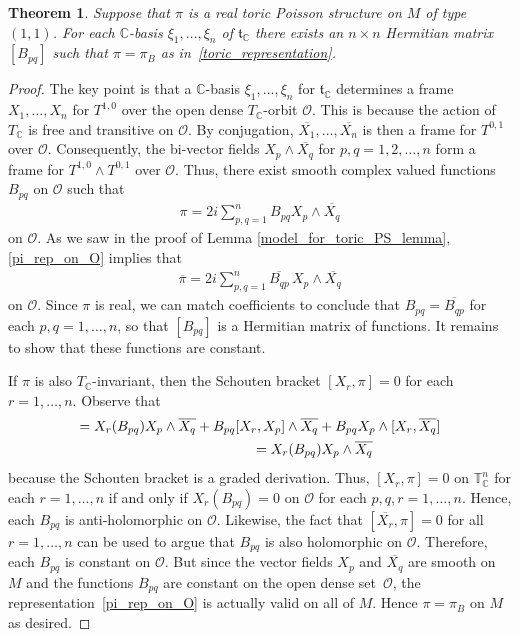 \documentclass[10pt,a4paper]{amsart}
\numberwithin{equation}{section}
\newtheorem{Theorem}{Theorem}[section]
\begin{document}
\begin{Theorem}\label{invariant_nondegenerate_PS_on_tori}
Suppose that $\pi$ is a real toric Poisson structure on $M$ of type $(1,1)$. For each ${\mathbb C}$-basis $\xi_1,\dots,\xi_n$ of ${\mathfrak t}_{\mathbb C}$ there exists an $n\times n$ Hermitian matrix $[B_{pq}]$ such that $\pi=\pi_B$ as in~\eqref{toric_representation}.
\end{Theorem}
\begin{proof}
The key point is that a ${\mathbb C}$-basis $\xi_1,\dots,\xi_n$ for ${\mathfrak t}_{\mathbb C}$ determines a frame $X_1,\dots,X_n$ for $T^{1,0}$ over the open dense $T_{\mathbb C}$-orbit $\mathcal O$. This is because the action of $T_{\mathbb C}$ is free and transitive on $\mathcal O$. By conjugation, $\overline{X_1},\dots,\overline{X_n}$ is then a frame for $T^{0,1}$ over $\mathcal O$. Consequently, the bi-vector f\/ields $X_p\wedge\overline{X_q}$ for $p,q=1,2,\dots,n$ form a frame for $T^{1,0}\wedge T^{0,1}$ over $\mathcal O$. Thus, there exist smooth complex valued functions $B_{pq}$ on $\mathcal O$ such that
\begin{gather}\label{pi_rep_on_O}
\pi=2i\sum_{p,q=1}^n B_{pq}X_p\wedge \overline{X_q}
\end{gather}
on $\mathcal O$. As we saw in the proof of Lemma \ref{model_for_toric_PS_lemma}, \eqref{pi_rep_on_O} implies that
\begin{gather*}
\overline{\pi}=2i\sum_{p,q=1}^n \overline{B_{qp}}\,X_p\wedge \overline{X_q}
\end{gather*}
on $\mathcal O$. Since $\pi$ is real, we can match coef\/f\/icients to conclude that $B_{pq}=\overline{B_{qp}}$ for each $p,q=1,\dots,n$, so that $[B_{pq}]$ is a Hermitian matrix of functions. It remains to show that these functions are constant.

If $\pi$ is also $T_{\mathbb C}$-invariant, then the Schouten bracket $[X_r,\pi]=0$ for each $r=1,\dots,n$. Observe that
\begin{gather*}
[X_r,B_{pq}X_p\wedge \overline{X_q}]=X_r(B_{pq})X_p\wedge \overline{X_q}+B_{pq}[X_r,X_p]\wedge \overline{X_q} + B_{pq}X_p\wedge [X_r,\overline{X_q}] \\
\hphantom{[X_r,B_{pq}X_p\wedge \overline{X_q}]}{} =X_r(B_{pq})X_p\wedge \overline{X_q}
\end{gather*}
because the Schouten bracket is a graded derivation. Thus, $[X_r,\pi]=0$ on ${\mathbb T}_{\mathbb C}^n$ for each $r=1,\dots,n$ if and only if $X_r(B_{pq})=0$ on $\mathcal O$ for each $p,q,r=1,\dots,n$. Hence, each $B_{pq}$ is anti-holomorphic on $\mathcal O$. Likewise, the fact that $[\overline{X_r},\pi]=0$ for all $r=1,\dots,n$ can be used to argue that $B_{pq}$ is also holomorphic on $\mathcal O$. Therefore, each $B_{pq}$ is constant on $\mathcal O$. But since the vector f\/ields $X_p$ and $\overline{X_q}$ are smooth on $M$ and the functions $B_{pq}$ are constant on the open dense set~$\mathcal O$, the representation~\eqref{pi_rep_on_O} is actually valid on all of $M$. Hence $\pi=\pi_B$ on $M$ as desired.
\end{proof}
\end{document}
